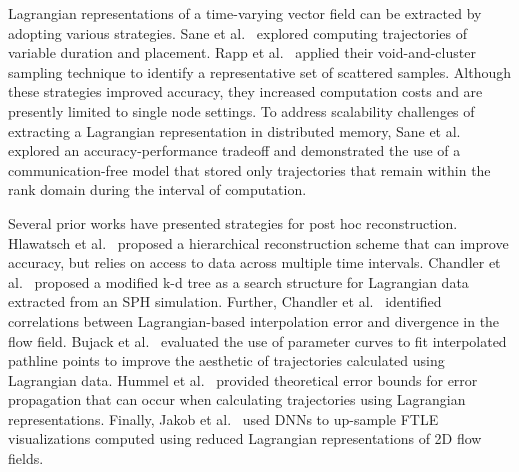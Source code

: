 %
%

Lagrangian representations of a time-varying vector field can be extracted by adopting various strategies.
%
Sane et al.~\cite{sane2019interpolation} explored computing trajectories of variable duration and placement. 
%
Rapp et al.~\cite{rapp2019void} applied their void-and-cluster sampling technique to identify a representative set of scattered samples.
%
Although these strategies improved accuracy, they increased computation costs and are presently limited to single node settings.
%
To address scalability challenges of extracting a Lagrangian representation in distributed memory, Sane et al.~\cite{sane2020scalable} explored an accuracy-performance tradeoff and demonstrated the use of a communication-free model that stored only trajectories that remain within the rank domain during the interval of computation.
%

Several prior works have presented strategies for post hoc reconstruction.
%
Hlawatsch et al.~\cite{hlawatsch2011hierarchical} proposed a hierarchical reconstruction scheme that can improve accuracy, but relies on access to data across multiple time intervals.
%
Chandler et al.~\cite{chandler2015interpolation} proposed a modified k-d tree as a search structure for Lagrangian data extracted from an SPH simulation.
%
Further, Chandler et al.~\cite{chandler2016analysis} identified correlations between Lagrangian-based interpolation error and divergence in the flow field.
%
Bujack et al.~\cite{bujack2015lagrangian} evaluated the use of parameter curves to fit interpolated pathline points to improve the aesthetic of trajectories calculated using Lagrangian data.
%
Hummel et al.~\cite{hummel2016error} provided theoretical error bounds for error propagation that can occur when calculating trajectories using Lagrangian representations. 
%
Finally, Jakob et al.~\cite{Jakob20} used DNNs to up-sample FTLE visualizations computed using reduced Lagrangian representations of 2D flow fields. 


